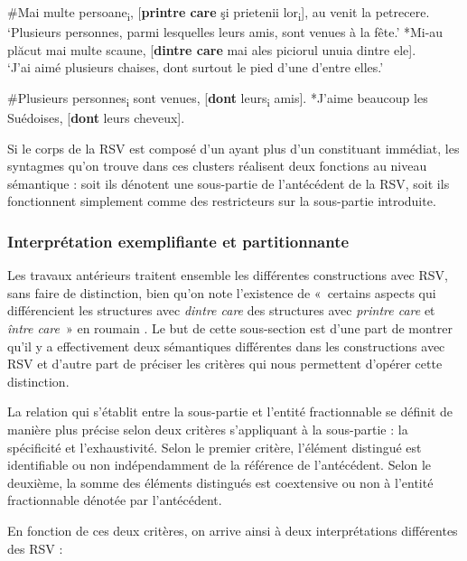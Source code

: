 \ea \label{ch3:ex60}
\ea 
\#Mai multe persoane\textsubscript{i}, [\textbf{printre care} şi prietenii lor\textsubscript{i}], au venit la petrecere. \label{ch3:ex60a}\\ 
\glt ‘Plusieurs personnes, parmi lesquelles leurs amis, sont venues à la fête.’ 
\ex 
*Mi-au plăcut mai multe scaune, [\textbf{dintre care} mai ales piciorul unuia dintre ele]. \label{ch3:ex60b}\\
\glt ‘J’ai aimé plusieurs chaises, dont surtout le pied d’une d’entre elles.’
\z 
\z 

\ea \label{ch3:ex61} 
\ea 
\#Plusieurs personnes\textsubscript{i} sont venues, [\textbf{dont} leurs\textsubscript{i} amis]. \label{ch3:ex61a} 
\ex
 *J’aime beaucoup les Suédoises, [\textbf{dont} leurs cheveux]. \label{ch3:ex61b}
\z 
\z

Si le corps de la RSV est composé d’un  ayant plus d’un constituant immédiat, les syntagmes qu’on trouve dans ces clusters réalisent deux fonctions au niveau sémantique : soit ils dénotent une sous-partie de l’antécédent de la RSV, soit ils fonctionnent simplement comme des restricteurs sur la sous-partie introduite.


\subsubsection{Interprétation exemplifiante et partitionnante}\label{ch3:sect3.3.2.2}

Les travaux antérieurs traitent ensemble les différentes constructions avec RSV, sans faire de distinction, bien qu’on note l’existence de «~certains aspects qui différencient les structures avec \textit{dintre care} des structures avec \textit{printre care} et \textit{între care}~» en roumain \citep[271]{Gheorghe2004}. Le but de cette sous-section est d’une part de montrer qu’il y a effectivement deux sémantiques différentes dans les constructions avec RSV et d’autre part de préciser les critères qui nous permettent d’opérer cette distinction.

La relation qui s’établit entre la sous-partie et l’entité fractionnable se définit de manière plus précise selon deux critères s’appliquant à la sous-partie : la spécificité et l’exhaustivité. Selon le premier critère, l’élément distingué est identifiable ou non indépendamment de la référence de l’antécédent. Selon le deuxième, la somme des éléments distingués est coextensive ou non à l’entité fractionnable dénotée par l’antécédent.  

En fonction de ces deux critères, on arrive ainsi à deux interprétations différentes des RSV : 

